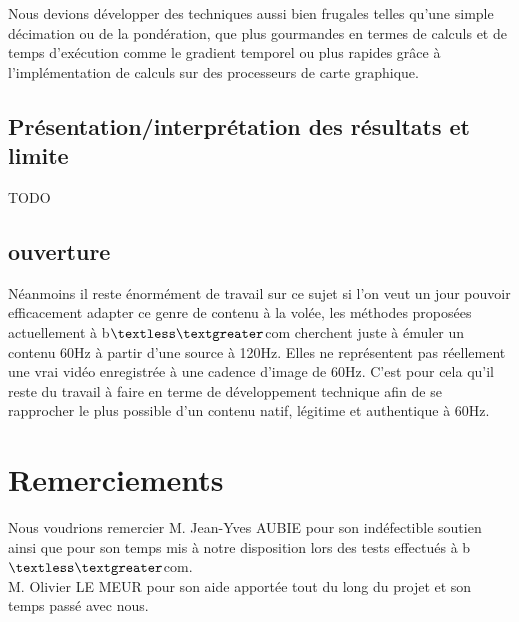 \documentclass[fleqn,10pt]{SelfArx} %
\newcommand{\bcom}{b$\textless\textgreater$com\xspace}
\begin{document}
Nous devions développer des techniques aussi bien frugales telles qu'une simple décimation ou de la pondération, que plus gourmandes en termes de calculs et de temps d'exécution comme le gradient temporel ou plus rapides grâce à l'implémentation de calculs sur des processeurs de carte graphique.
\subsection{Présentation/interprétation des résultats et limite}
TODO
\subsection{ouverture}
Néanmoins il reste énormément de travail sur ce sujet si l'on veut un jour pouvoir efficacement adapter ce genre de contenu à la volée, les méthodes proposées actuellement à \bcom cherchent juste à émuler un contenu 60Hz à partir d'une source à 120Hz. Elles ne représentent pas réellement une vrai vidéo enregistrée à une cadence d'image de 60Hz. C'est pour cela qu'il reste du travail à faire en terme de développement technique afin de se rapprocher le plus possible d'un contenu natif, légitime et authentique à 60Hz.
\section*{Remerciements} %


Nous voudrions remercier M. Jean-Yves AUBIE pour son indéfectible soutien ainsi que pour son temps mis à notre disposition lors des tests effectués à \bcom.\\

M. Olivier LE MEUR pour son aide apportée tout du long du projet et son temps passé avec nous.




\end{document}
